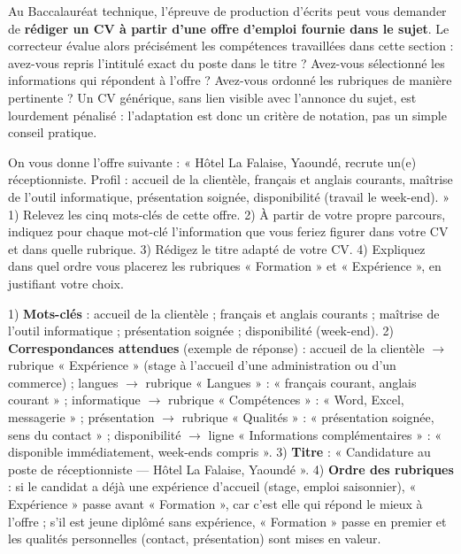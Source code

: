 \documentclass[11pt]{article}
\begin{document}
\begin{savaistu}
Au Baccalauréat technique, l'épreuve de production d'écrits peut vous demander de \textbf{rédiger un CV à partir d'une offre d'emploi fournie dans le sujet}. Le correcteur évalue alors précisément les compétences travaillées dans cette section : avez-vous repris l'intitulé exact du poste dans le titre ? Avez-vous sélectionné les informations qui répondent à l'offre ? Avez-vous ordonné les rubriques de manière pertinente ? Un CV générique, sans lien visible avec l'annonce du sujet, est lourdement pénalisé : l'adaptation est donc un critère de notation, pas un simple conseil pratique.
\end{savaistu}

\begin{exercice}
On vous donne l'offre suivante : « Hôtel La Falaise, Yaoundé, recrute un(e) réceptionniste. Profil : accueil de la clientèle, français et anglais courants, maîtrise de l'outil informatique, présentation soignée, disponibilité (travail le week-end). »
1) Relevez les cinq mots-clés de cette offre.
2) À partir de votre propre parcours, indiquez pour chaque mot-clé l'information que vous feriez figurer dans votre CV et dans quelle rubrique.
3) Rédigez le titre adapté de votre CV.
4) Expliquez dans quel ordre vous placerez les rubriques « Formation » et « Expérience », en justifiant votre choix.
\end{exercice}

\begin{corrige}
1) \textbf{Mots-clés} : accueil de la clientèle ; français et anglais courants ; maîtrise de l'outil informatique ; présentation soignée ; disponibilité (week-end).
2) \textbf{Correspondances attendues} (exemple de réponse) : accueil de la clientèle $\rightarrow$ rubrique « Expérience » (stage à l'accueil d'une administration ou d'un commerce) ; langues $\rightarrow$ rubrique « Langues » : « français courant, anglais courant » ; informatique $\rightarrow$ rubrique « Compétences » : « Word, Excel, messagerie » ; présentation $\rightarrow$ rubrique « Qualités » : « présentation soignée, sens du contact » ; disponibilité $\rightarrow$ ligne « Informations complémentaires » : « disponible immédiatement, week-ends compris ».
3) \textbf{Titre} : « Candidature au poste de réceptionniste — Hôtel La Falaise, Yaoundé ».
4) \textbf{Ordre des rubriques} : si le candidat a déjà une expérience d'accueil (stage, emploi saisonnier), « Expérience » passe avant « Formation », car c'est elle qui répond le mieux à l'offre ; s'il est jeune diplômé sans expérience, « Formation » passe en premier et les qualités personnelles (contact, présentation) sont mises en valeur.
\end{corrige}
\end{document}
